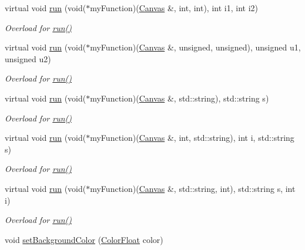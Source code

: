 \begin{DoxyCompactItemize}
virtual void \hyperlink{classtsgl_1_1_canvas_a768c10737f9590a25d8e66dcc7137d9b}{run} (void($\ast$my\-Function)(\hyperlink{classtsgl_1_1_canvas}{Canvas} \&, int, int), int i1, int i2)
\begin{DoxyCompactList}\small\item\em Overload for \hyperlink{classtsgl_1_1_canvas_a5f3f00d6c380a662a239077456045502}{run()} \end{DoxyCompactList}\item 
virtual void \hyperlink{classtsgl_1_1_canvas_ab146e6cf9f7f19a047c20c02a0eb30f9}{run} (void($\ast$my\-Function)(\hyperlink{classtsgl_1_1_canvas}{Canvas} \&, unsigned, unsigned), unsigned u1, unsigned u2)
\begin{DoxyCompactList}\small\item\em Overload for \hyperlink{classtsgl_1_1_canvas_a5f3f00d6c380a662a239077456045502}{run()} \end{DoxyCompactList}\item 
virtual void \hyperlink{classtsgl_1_1_canvas_a2eeece8d4c4453ec7b4b53e209004559}{run} (void($\ast$my\-Function)(\hyperlink{classtsgl_1_1_canvas}{Canvas} \&, std\-::string), std\-::string s)
\begin{DoxyCompactList}\small\item\em Overload for \hyperlink{classtsgl_1_1_canvas_a5f3f00d6c380a662a239077456045502}{run()} \end{DoxyCompactList}\item 
virtual void \hyperlink{classtsgl_1_1_canvas_ac507bbbf60328de2fc99f93cd37d04ec}{run} (void($\ast$my\-Function)(\hyperlink{classtsgl_1_1_canvas}{Canvas} \&, int, std\-::string), int i, std\-::string s)
\begin{DoxyCompactList}\small\item\em Overload for \hyperlink{classtsgl_1_1_canvas_a5f3f00d6c380a662a239077456045502}{run()} \end{DoxyCompactList}\item 
virtual void \hyperlink{classtsgl_1_1_canvas_aafed71cba89b059629647e77ba23ff2b}{run} (void($\ast$my\-Function)(\hyperlink{classtsgl_1_1_canvas}{Canvas} \&, std\-::string, int), std\-::string s, int i)
\begin{DoxyCompactList}\small\item\em Overload for \hyperlink{classtsgl_1_1_canvas_a5f3f00d6c380a662a239077456045502}{run()} \end{DoxyCompactList}\item 
void \hyperlink{classtsgl_1_1_canvas_abb668fe42e2fe7f269b255152df959d8}{set\-Background\-Color} (\hyperlink{structtsgl_1_1_color_float}{Color\-Float} color)

\end{DoxyCompactItemize}
